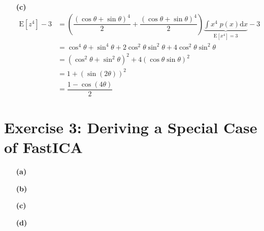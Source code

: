 \documentclass{article}
\newcommand{\prob}[1]{p\!\left(#1\right)}
\newcommand{\expect}[1]{\mathrm{E}\left[#1\right]}
\newcommand{\dx}{\mathrm{d}x}
\begin{document}
\begin{itemize}
\item[\textbf{(c)}]
\begin{align*}
\expect{z^4} - 3
	&= \left(  \dfrac{\left( \cos \theta + \sin \theta \right)^4}{2} +  \dfrac{\left( \cos \theta + \sin \theta \right)^4}{2} \right) \underbrace{\int x^4 \; \prob{x} \dx}_{\expect{x^4}=3} - 3 \\
	&= \cos^4 \theta + \sin^4 \theta + 2 \cos^2 \theta \sin^2 \theta + 4 \cos^2 \theta \sin^2 \theta \\
	&= \left( \cos^2 \theta + \sin^2 \theta \right)^2 + 4 \left( \cos \theta \sin \theta \right)^2 \\
	&= 1 + \left( \sin(2 \theta) \right)^2 \\
	&= \dfrac{1 - \cos(4 \theta)}{2}
\end{align*}
\end{itemize}

\section*{Exercise 3: Deriving a Special Case of FastICA} 
\begin{itemize}
\item[\textbf{(a)}]
\item[\textbf{(b)}]
\item[\textbf{(c)}]
\item[\textbf{(d)}]
\end{itemize}
\end{document}
